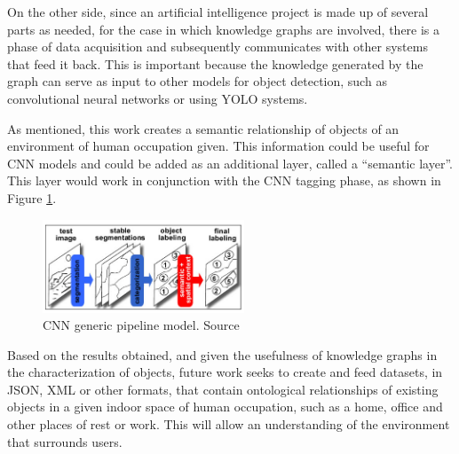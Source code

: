 On the other side, since an artificial intelligence project is made up of several parts as needed, for the case in which knowledge graphs are involved, there is a phase of data acquisition and subsequently communicates with other systems that feed it back. This is important because the knowledge generated by the graph can serve as input to other models for object detection, such as convolutional neural networks or using YOLO systems.

As mentioned, this work creates a semantic relationship of objects of an environment of human occupation given. This information could be useful for CNN models and could be added as an additional layer, called a ``semantic layer''. This layer would work in conjunction with the CNN tagging phase, as shown in Figure \ref{fig:pipeline}.

\begin{figure}[H]
    \centering
    \includegraphics[width=6cm]{figures/pipeline.png}
    \caption{CNN generic pipeline model. Source \cite{Galleguillos2}}
    \label{fig:pipeline}
\end{figure}


Based on the results obtained, and given the usefulness of knowledge graphs in the characterization of objects, future work seeks to create and feed datasets, in JSON, XML or other formats, that contain ontological relationships of existing objects in a given indoor space of human occupation, such as a home, office and other places of rest or work. This will allow an understanding of the environment that surrounds users.

